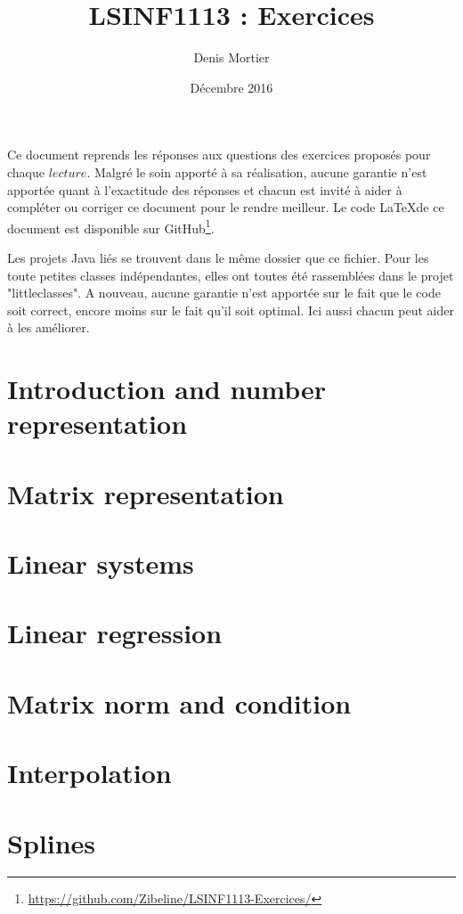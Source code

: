 \documentclass{article}
\title{LSINF1113 : Exercices}
\author{Denis Mortier}
\date{Décembre 2016}
\begin{document}
\maketitle

Ce document reprends les réponses aux questions des exercices proposés pour chaque $lecture$. Malgré le soin apporté à sa réalisation, aucune garantie n'est apportée quant à l'exactitude des réponses et chacun est invité à aider à compléter ou corriger ce document pour le rendre meilleur. Le code \LaTeX de ce document est disponible sur GitHub\footnote{\url{https://github.com/Zibeline/LSINF1113-Exercices/}}.

Les projets Java liés se trouvent dans le même dossier que ce fichier. Pour les toute petites classes indépendantes, elles ont toutes été rassemblées dans le projet "littleclasses". A nouveau, aucune garantie n'est apportée sur le fait que le code soit correct, encore moins sur le fait qu'il soit optimal. Ici aussi chacun peut aider à les améliorer.

\section{Introduction and number representation}


\section{Matrix representation}


\section{Linear systems}


\section{Linear regression}


\section{Matrix norm and condition}


\section{Interpolation}


\section{Splines}

\end{document}
